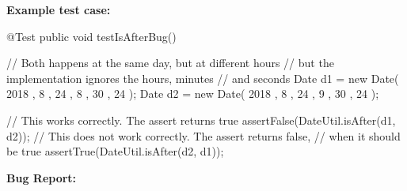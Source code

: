 \documentclass[fontsize=12pt,paper=letter,twoside]{scrartcl}
\begin{document}
\bigskip

\noindent \textbf{Example test case:} \label{isAfter:example_test_case}

\begin{code}
    @Test
    public void testIsAfterBug() {
    	// Both happens at the same day, but at different hours
    	// but the implementation ignores the hours, minutes
    	// and seconds
    	Date d1 = new Date( 2018 , 8 , 24 , 8 , 30 , 24 );
    	Date d2 = new Date( 2018 , 8 , 24 , 9 , 30 , 24 );
    	
    	// This works correctly. The assert returns true
    	assertFalse(DateUtil.isAfter(d1, d2));
    	// This does not work correctly. The assert returns false,
    	// when it should be true
    	assertTrue(DateUtil.isAfter(d2, d1));
    }
\end{code}

\bigskip

\noindent \textbf{Bug Report:}
\end{document}
